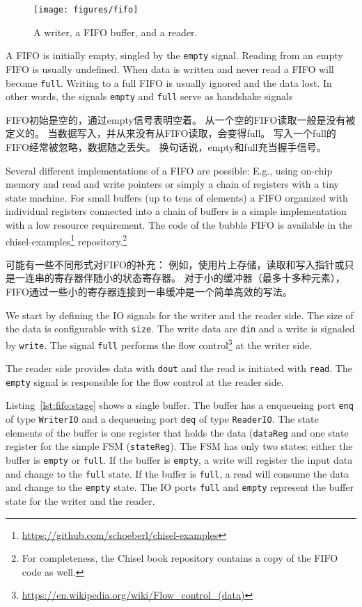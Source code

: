 \documentclass[%
    10pt,
    headinclude, footexclude,
    openright, %
    notitlepage,
    cleardoubleempty,
    headsepline,
    pointlessnumbers,
    bibtotoc, idxtotoc,
    ]{scrbook}
\newcommand{\code}[1]{{\small{\texttt{#1}}}}
\newcommand{\myref}[2]{\href{#1}{#2}}
\renewcommand{\myref}[2]{{#2}{\footnote{\url{#1}}}}
\begin{document}
\begin{figure}
  \centering
  \texttt{[image: figures/fifo]}
  \caption{A writer, a FIFO buffer, and a reader.}
  \label{fig:fifo}
\end{figure}

A FIFO is initially empty, singled by the \code{empty} signal. Reading
from an empty FIFO is usually undefined. When data is written and never
read a FIFO will become \code{full}. Writing to a full FIFO is usually ignored
and the data lost. In other words, the signals \code{empty} and \code{full}
serve as handshake signals 

FIFO初始是空的，通过empty信号表明空着。
从一个空的FIFO读取一般是没有被定义的。
当数据写入，并从来没有从FIFO读取，会变得full。
写入一个full的FIFO经常被忽略，数据随之丢失。
换句话说，empty和full充当握手信号。

Several different implementations of a FIFO are possible: E.g., using on-chip
memory and read and write pointers or simply a chain of registers with a
tiny state machine. For small buffers (up to tens of elements) a FIFO organized
with individual registers connected into a chain of buffers is a simple
implementation with a low resource requirement.
The code of the bubble FIFO is available in the
\myref{https://github.com/schoeberl/chisel-examples}{chisel-examples}
repository.\footnote{For completeness, the Chisel book repository contains
a copy of the FIFO code as well.}

可能有一些不同形式对FIFO的补充：
例如，使用片上存储，读取和写入指针或只是一连串的寄存器伴随小的状态寄存器。
对于小的缓冲器（最多十多种元素）， FIFO通过一些小的寄存器连接到一串缓冲是一个简单高效的写法。

We start by defining the IO signals for the writer and the reader side.
The size of the data is configurable with \code{size}.
The write data are \code{din} and a write is signaled by \code{write}.
The signal \code{full} performs the
\myref{https://en.wikipedia.org/wiki/Flow_control_(data)}{flow control}
at the writer side.


The reader side provides data with \code{dout} and the read is initiated
with \code{read}. The \code{empty} signal is responsible for the flow control
at the reader side.


Listing~\ref{lst:fifo:stage} shows a single buffer. The buffer has a enqueueing port
\code{enq} of type \code{WriterIO} and a dequeueing port \code{deq} of type
\code{ReaderIO}. The state elements of the buffer is one register that holds the
data (\code{dataReg} and one state register for the simple FSM (\code{stateReg}).
The FSM has only two states: either the buffer is \code{empty} or \code{full}.
If the buffer is \code{empty}, a write will register the input data and change
to the \code{full} state.
If the buffer is \code{full}, a read will consume the data and change to the
\code{empty} state.
The IO ports \code{full} and \code{empty} represent the buffer state for
the writer and the reader.
\end{document}
